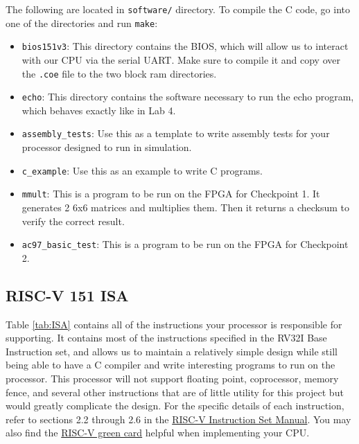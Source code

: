 \documentclass[11pt]{article}
\begin{document}
The following are located in \verb|software/| directory. To compile the C code, go into one of the directories and run \verb|make|:
\begin{itemize}
	\item \verb|bios151v3|: This directory contains the BIOS, which will allow us to interact with our CPU via the serial UART. Make sure to compile it and copy over the \verb|.coe| file to the two block ram directories.
	\item \verb|echo|: This directory contains the software necessary to run the echo program, which behaves exactly like in Lab 4.
	\item \verb|assembly_tests|: Use this as a template to write assembly tests for your processor designed to run in simulation.
	\item \verb|c_example|: Use this as an example to write C programs.
	\item \verb|mmult|: This is a program to be run on the FPGA for Checkpoint 1. It generates 2 6x6 matrices and multiplies them. Then it returns a checksum to verify the correct result.
	\item \verb|ac97_basic_test|: This is a program to be run on the FPGA for Checkpoint 2.
\end{itemize}

\subsection{RISC-V 151 ISA}

Table \ref{tab:ISA} contains all of the instructions your processor is responsible for supporting. It contains most of the instructions specified in the RV32I Base Instruction set, and allows us to maintain a relatively simple design while still being able to have a C compiler and write interesting programs to run on the processor. This processor will not support floating point, coprocessor, memory fence, and several other instructions that are of little utility for this project but would greatly complicate the design. For the specific details of each instruction, refer to sections 2.2 through 2.6 in the \href{http://riscv.org/specifications/}{RISC-V Instruction Set Manual}. You may also find the \href{https://www.cl.cam.ac.uk/teaching/1516/ECAD+Arch/files/docs/RISCVGreenCardv8-20151013.pdf}{RISC-V green card} helpful when implementing your CPU.
\end{document}
